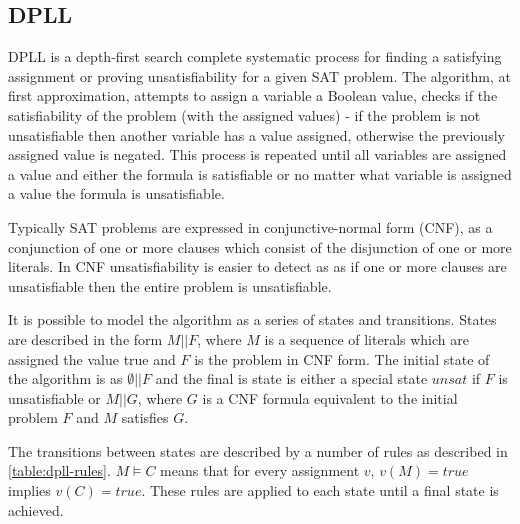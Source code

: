 \documentclass[]{final_report}
\begin{document}
\subsection{DPLL}
DPLL is a depth-first search complete systematic process for finding a satisfying assignment or proving unsatisfiability for a given SAT problem.  The algorithm, at first approximation, attempts to assign a variable a Boolean value, checks if the satisfiability of the problem (with the assigned values) - if the problem is not unsatisfiable then another variable has a value assigned, otherwise the previously assigned value is negated. This process is repeated until all variables are assigned a value and either the formula is satisfiable or no matter what variable is assigned a value the formula is unsatisfiable. 

Typically SAT problems are expressed in conjunctive-normal form (CNF), as a conjunction of one or more clauses which consist of the disjunction of one or more literals. In CNF unsatisfiability is easier to detect as as if one or more clauses are unsatisfiable then the entire problem is unsatisfiable.

It is possible to model the algorithm as a series of states and transitions. States are described in the form $M || F$, where $M$ is a sequence of literals which are assigned the value true and $F$ is the problem in CNF form. The initial state of the algorithm is as $\emptyset || F $ and the final is state is either a special state $unsat$ if $F$ is unsatisfiable or $M || G $, where $G$ is a CNF formula equivalent to the initial problem $F$ and $M$ satisfies $G$. 

The transitions between states are described by a number of rules as described in \ref{table:dpll-rules}. $M \models C$  means that for every assignment $v$, $v(M) = true$ implies $v(C) = true$. These rules are applied to each state until a final state is achieved.
\end{document}
